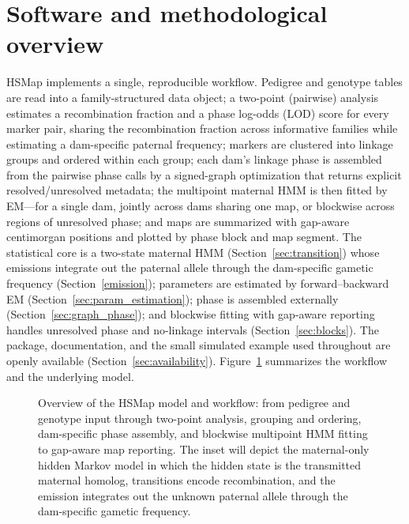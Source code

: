 \documentclass[11pt]{article}
\begin{document}
\section{Software and methodological overview}
\textsf{HSMap} implements a single, reproducible workflow. Pedigree and genotype tables
are read into a family-structured data object; a two-point (pairwise) analysis estimates
a recombination fraction and a phase log-odds (LOD) score for every marker pair, sharing
the recombination fraction across informative families while estimating a dam-specific
paternal frequency; markers are clustered into linkage groups and ordered within each
group; each dam's linkage phase is assembled from the pairwise phase calls by a
signed-graph optimization that returns explicit resolved/unresolved metadata; the
multipoint maternal HMM is then fitted by EM---for a single dam, jointly across dams
sharing one map, or blockwise across regions of unresolved phase; and maps are summarized
with gap-aware centimorgan positions and plotted by phase block and map segment. The
statistical core is a two-state maternal HMM (Section~\ref{sec:transition}) whose
emissions integrate out the paternal allele through the dam-specific gametic frequency
(Section~\ref{emission}); parameters are estimated by forward--backward EM
(Section~\ref{sec:param_estimation}); phase is assembled externally
(Section~\ref{sec:graph_phase}); and blockwise fitting with gap-aware reporting handles
unresolved phase and no-linkage intervals (Section~\ref{sec:blocks}). The package,
documentation, and the small simulated example used throughout are openly available
(Section~\ref{sec:availability}). Figure~\ref{fig:method} summarizes the workflow and the
underlying model.

\begin{figure}[t]
\centering
{}
\caption{Overview of the \textsf{HSMap} model and workflow: from pedigree and genotype
input through two-point analysis, grouping and ordering, dam-specific phase assembly, and
blockwise multipoint HMM fitting to gap-aware map reporting. The inset will depict the
maternal-only hidden Markov model in which the hidden state is the transmitted maternal
homolog, transitions encode recombination, and the emission integrates out the unknown
paternal allele through the dam-specific gametic frequency.}
\label{fig:method}
\end{figure}
\end{document}
